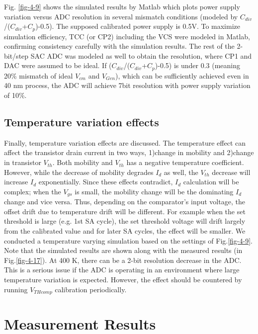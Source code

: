 Fig. \ref{fig-4-9} shows the simulated results by Matlab which plots power supply variation versus ADC resolution in several mismatch conditions (modeled by $C_{div}$/($C_{div}$+$C_p$)-0.5). The supposed calibrated power supply is 0.5V. To maximize simulation efficiency, TCC (or CP2) including the VCS were modeled in Matlab, confirming consistency carefully with the simulation results. 
The rest of the 2-bit/step SAC ADC was modeled as well to obtain the resolution, where CP1 and DAC were assumed to be ideal. 
If ($C_{div}$/($C_{div}$+$C_p$)-0.5) is under 0.3 (meaning 20\% mismatch of ideal $V_{cm}$ and $V_{Gen}$), which can be sufficiently achieved even in 40 nm process, the ADC will achieve 7bit resolution with power supply variation of 10\%.

\subsection{Temperature variation effects}
Finally, temperature variation effects are discussed. The temperature effect can affect the transistor drain current in two ways, 1)change in mobility and 2)change in transistor $V_{th}$. Both mobility and $V_{th}$ has a negative temperature coefficient. 
However, while the decrease of mobility degrades $I_d$ as well, the $V_{th}$ decrease will increase $I_d$ exponentially. Since these effects contradict, $I_d$ calculation will be complex; when the $V_{gs}$ is small, the mobility change will be the dominating $I_d$ change and vice versa. Thus, depending on the comparator's input voltage, the offset drift due to temperature drift will be different. For example when the set threshold is large (e.g. 1st SA cycle), the set threshold voltage will drift largely from the calibrated value and for later SA cycles, the effect will be smaller. We conducted a temperature varying simulation based on the settings of Fig.\ref{fig-4-9}. Note that the simulated results are shown along with the measured results (in Fig.\ref{fig-4-17}).
At 400 K, there can be a 2-bit resolution decrease in the ADC. This is a serious issue if the ADC is operating in an environment where large temperature variation is expected. However, the effect should be countered by running $V_{THcomp}$ calibration periodically.


\section{Measurement Results}

